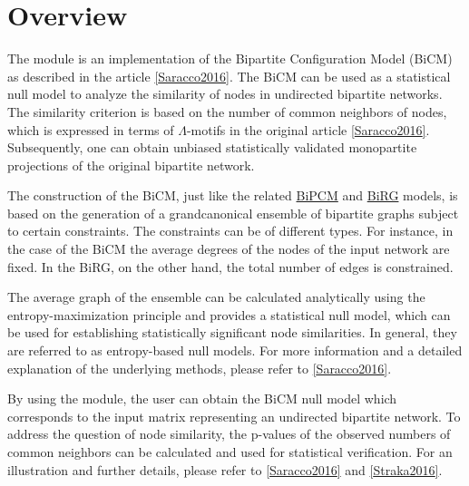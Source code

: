 \documentclass[letterpaper,10pt,english]{sphinxmanual}
\begin{document}
\section{Overview}
\label{source/overview:overview}\label{source/overview::doc}\label{source/overview:id1}
The  module is an implementation of the Bipartite Configuration Model
(BiCM) as described in the article {\hyperref[source/overview:saracco2016]{{[}Saracco2016{]}}}. The BiCM can be used as a
statistical null model to analyze the similarity of nodes in undirected
bipartite networks. The similarity criterion is based on the number of common
neighbors of nodes, which is expressed in terms of \(\Lambda\)-motifs in
the original article {\hyperref[source/overview:saracco2016]{{[}Saracco2016{]}}}. Subsequently, one can obtain
unbiased statistically validated monopartite projections of the original bipartite
network.

The construction of the BiCM, just like the related \href{https://github.com/tsakim/bipcm}{BiPCM} and \href{https://github.com/tsakim/birg}{BiRG} models, is based on the generation of a
grandcanonical ensemble of bipartite graphs subject to certain constraints. The
constraints can be of different types. For instance, in the case of the BiCM
the average degrees of the nodes of the input network are fixed. In the BiRG,
on the other hand, the total number of edges is constrained.

The average graph of the ensemble can be calculated analytically using the
entropy-maximization principle and provides a statistical null model, which can
be used for establishing statistically significant node similarities. In
general, they are referred to as entropy-based null models. For more
information and a detailed explanation of the underlying methods, please refer
to {\hyperref[source/overview:saracco2016]{{[}Saracco2016{]}}}.

By using the  module, the user can obtain the BiCM null model which
corresponds to the input matrix representing an undirected bipartite network.
To address the question of node similarity, the p-values of the observed
numbers of common neighbors can be calculated and used for statistical
verification. For an illustration and further details, please refer to
{\hyperref[source/overview:saracco2016]{{[}Saracco2016{]}}} and {\hyperref[source/overview:straka2016]{{[}Straka2016{]}}}.
\end{document}
